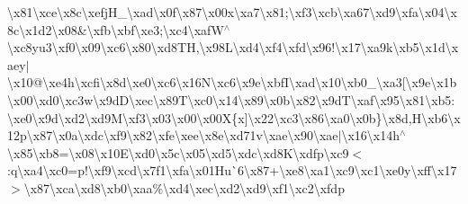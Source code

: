 \textbackslash{}x81\textbackslash{}xce\textbackslash{}x8c\textbackslash{}xefj\+H\+\_\textbackslash{}xad\textbackslash{}x0f\textbackslash{}x87\textbackslash{}x00x\textbackslash{}xa7\textbackslash{}x81;\textbackslash{}xf3\textbackslash{}xcb\textbackslash{}xa67\textbackslash{}xd9\textbackslash{}xfa\textbackslash{}x04\textbackslash{}x8c\textbackslash{}x1d2\textbackslash{}x08\&\textbackslash{}xfb\textbackslash{}xbf\textbackslash{}xe3;\textbackslash{}xc4\textbackslash{}xaf\+W$^\wedge$\textbackslash{}xc8yu3\textbackslash{}xf0\textbackslash{}x09\textbackslash{}xc6\textbackslash{}x80\textbackslash{}xd8\+T\+H,\textbackslash{}x98\+L\textbackslash{}xd4\textbackslash{}xf4\textbackslash{}xfd\textbackslash{}x96!\textbackslash{}x17\textbackslash{}xa9k\textbackslash{}xb5\textbackslash{}x1d\textbackslash{}xaey$\vert$\textbackslash{}x10@\textbackslash{}xe4h\textbackslash{}xcfi\textbackslash{}x8d\textbackslash{}xe0\textbackslash{}xc6\textbackslash{}x16\+N\textbackslash{}xc6\textbackslash{}x9e\textbackslash{}xbf\+I\textbackslash{}xad\textbackslash{}x10\textbackslash{}xb0\+\_\+\textbackslash{}xa3\mbox{[}\textbackslash{}x9e\textbackslash{}x1b\textbackslash{}x00\textbackslash{}xd0\textbackslash{}xc3w\textbackslash{}x9d\+D\textbackslash{}xec\textbackslash{}x89\+T\textbackslash{}xc0\textbackslash{}x14\textbackslash{}x89\textbackslash{}x0b\textbackslash{}x82\textbackslash{}x9d\+T\textbackslash{}xaf\textbackslash{}x95\textbackslash{}x81\textbackslash{}xb5\+:\textbackslash{}xe0\textbackslash{}x9d\textbackslash{}xd2\textbackslash{}xd9\+M\textbackslash{}xf3\textbackslash{}x03\textbackslash{}x00\textbackslash{}x00\+X\{x\mbox{]}\textbackslash{}x22\textbackslash{}xc3\textbackslash{}x86\textbackslash{}xa0\textbackslash{}x0b\}\textbackslash{}x8d,\+H\textbackslash{}xb6\textbackslash{}x12p\textbackslash{}x87\textbackslash{}x0a\textbackslash{}xdc\textbackslash{}xf9\textbackslash{}x82\textbackslash{}xfe\textbackslash{}xee\textbackslash{}x8e\textbackslash{}xd71v\textbackslash{}xae\textbackslash{}x90\textbackslash{}xae$\vert$\textbackslash{}x16\textbackslash{}x14h$^\wedge$\textbackslash{}x85\textbackslash{}xb8=\textbackslash{}x08\textbackslash{}x10\+E\textbackslash{}xd0\textbackslash{}x5c\textbackslash{}x05\textbackslash{}xd5\textbackslash{}xdc\textbackslash{}xd8\+K\textbackslash{}xdfp\textbackslash{}xc9$<$\+:q\textbackslash{}xa4\textbackslash{}xc0=p!\textbackslash{}xf9\textbackslash{}xcd\textbackslash{}x7f\textquotesingle{}1\textbackslash{}xfa\textbackslash{}x01\+Hu\`{}6\textbackslash{}x87+\textbackslash{}xe8\textbackslash{}xa1\textbackslash{}xc9\textbackslash{}xc1\textbackslash{}xe0y\textbackslash{}xff\textbackslash{}x17$>$\textbackslash{}x87\textbackslash{}xca\textbackslash{}xd8\textbackslash{}xb0\textbackslash{}xaa\%\textbackslash{}xd4\textbackslash{}xec\textbackslash{}xd2\textbackslash{}xd9\textbackslash{}xf1\textbackslash{}xc2\textbackslash{}xfdp 